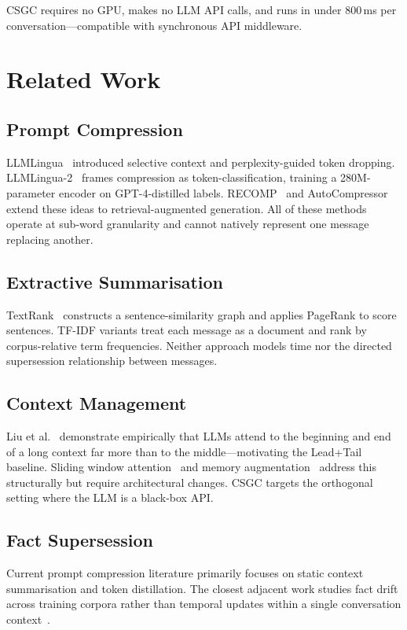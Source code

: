 \documentclass[conference]{IEEEtran}
\newcommand{\csgc}{\textsc{CSGC}}
\begin{document}
\csgc{} requires no GPU, makes no LLM API calls, and runs in under 800\,ms
per conversation---compatible with synchronous API middleware.

\section{Related Work}
\label{sec:related}

\subsection{Prompt Compression}
LLMLingua~\cite{jiang2023llmlingua} introduced selective context and
perplexity-guided token dropping. LLMLingua-2~\cite{pan2024llmlingua2} frames
compression as token-classification, training a 280M-parameter encoder on
GPT-4-distilled labels. RECOMP~\cite{xu2023recomp} and
AutoCompressor~\cite{chevalier2023autocompressor} extend these ideas to
retrieval-augmented generation. All of these methods operate at sub-word
granularity and cannot natively represent one message replacing another.

\subsection{Extractive Summarisation}
TextRank~\cite{mihalcea2004textrank} constructs a sentence-similarity graph
and applies PageRank to score sentences. TF-IDF variants treat each message
as a document and rank by corpus-relative term frequencies. Neither approach
models time nor the directed supersession relationship between messages.

\subsection{Context Management}
Liu et al.~\cite{liu2023lostmiddle} demonstrate empirically that LLMs attend
to the beginning and end of a long context far more than to the
middle---motivating the Lead+Tail baseline. Sliding window
attention~\cite{beltagy2020longformer} and memory
augmentation~\cite{wu2022memorizing} address this structurally but require
architectural changes. \csgc{} targets the orthogonal setting where the LLM
is a black-box API.

\subsection{Fact Supersession}
Current prompt compression literature primarily focuses on static context
summarisation and token distillation. The closest adjacent work studies fact
drift across training corpora rather than temporal updates within a single
conversation context~\cite{dhingra2022timedial}.
\end{document}
